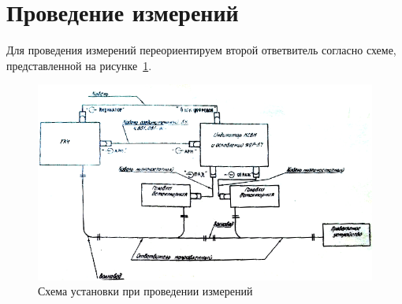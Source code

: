\documentclass[a4paper]{hedwork}
\begin{document}
    \section{Проведение измерений}
    Для проведения измерений переориентируем второй ответвитель согласно схеме, представленной на рисунке~\ref{mea}.
    \begin{figure}[h!]
        \center
        \includegraphics[width=.6\textwidth]{2}
        \caption{Схема установки при проведении измерений}
        \label{mea}
    \end{figure}
\end{document}
